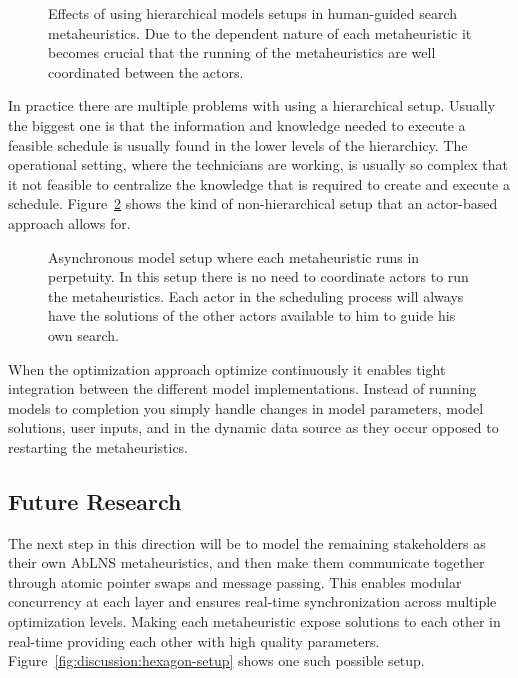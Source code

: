 \begin{figure}[H]
	\label{fig:discussion:hierarchical_model_setup}
	\caption{Effects of using hierarchical models setups in human-guided search metaheuristics.
	Due to the dependent nature of each metaheuristic it becomes crucial that the running of 
	the metaheuristics are well coordinated between the actors.}
\end{figure}

In practice there are multiple problems with using a hierarchical setup.
Usually the biggest one is that the information and knowledge needed to 
execute a feasible schedule is usually found in the lower levels of the 
hierarchicy. The operational setting, where the
technicians are working, is usually so complex that it not feasible to 
centralize the knowledge that is required to create and execute a 
schedule. Figure~\ref{fig:discussion:asynchronous_setup}
shows the kind of non-hierarchical setup that an actor-based approach 
allows for.

\begin{figure}[H]
	
	\caption{Asynchronous model setup where each metaheuristic runs in perpetuity. In this setup
		there is no need to coordinate actors to run the metaheuristics. Each actor in the 
		scheduling process will always have the solutions of the other actors available to 
		him to guide his own search.
	}\label{fig:discussion:asynchronous_setup}
\end{figure}

When the optimization approach optimize continuously it enables tight
integration between the different model implementations. Instead of running
models to completion you simply handle changes in model parameters, model
solutions, user inputs, and in the dynamic data source as they occur opposed to
restarting the metaheuristics.

\subsection{Future Research}\label{sec:discussion:future_research}
The next step in this direction will be to model the remaining stakeholders as
their own  AbLNS metaheuristics, and then make them communicate together through
atomic pointer swaps and message passing. This enables modular concurrency at
each layer and ensures real-time synchronization across multiple optimization
levels. Making each metaheuristic expose solutions to each  other in real-time
providing each other with high quality parameters. 
Figure~\ref{fig:discussion:hexagon-setup} shows one such possible setup.


